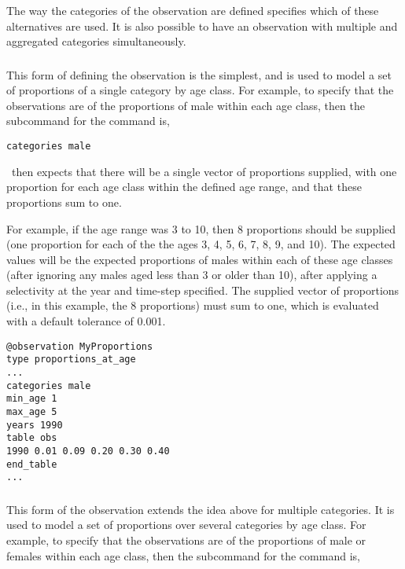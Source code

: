 The way the categories of the observation are defined specifies which of these alternatives are used. It is also possible to have an observation with multiple and aggregated categories simultaneously.

\subsubsection*{}

This form of defining the observation is the simplest, and is used to model a set of proportions of a single category by age class. For example, to specify that the observations are of the proportions of male within each age class, then the subcommand  for the  command is,

{\small{\begin{verbatim}
categories male
\end{verbatim}}}

\CNAME\ then expects that there will be a single vector of proportions supplied, with one proportion for each age class within the defined age range, and that these proportions sum to one. 

For example, if the age range was 3 to 10, then 8 proportions should be supplied (one proportion for each of the the ages 3, 4, 5, 6, 7, 8, 9, and 10). The expected values will be the expected proportions of males within each of these age classes (after ignoring any males aged less than 3 or older than 10), after applying a selectivity at the year and time-step specified. The supplied vector of proportions (i.e., in this example, the 8 proportions) must sum to one, which is evaluated with a default tolerance of 0.001. 


{\small{\begin{verbatim}
@observation MyProportions
type proportions_at_age
...
categories male
min_age 1
max_age 5
years 1990
table obs
1990 0.01 0.09 0.20 0.30 0.40
end_table
...
\end{verbatim}}}


\subsubsection*{}

This form of the observation extends the idea above for multiple categories. It is used to model a set of proportions over several categories by age class. For example, to specify that the observations are of the proportions of male or females within each age class, then the subcommand  for the  command is,

